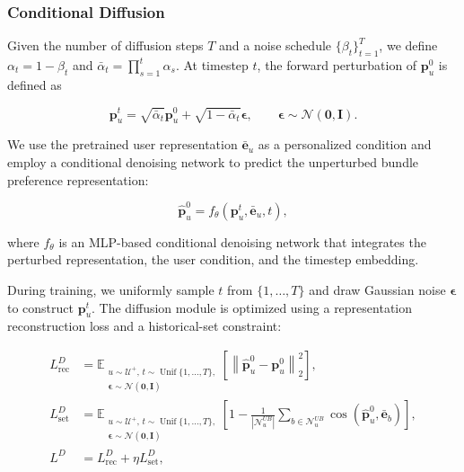 \documentclass[letterpaper]{article}
\begin{document}
\subsubsection{Conditional Diffusion}

Given the number of diffusion steps $T$ and a noise schedule
$\{\beta_t\}_{t=1}^{T}$, we define
$\alpha_t=1-\beta_t$ and
$\bar{\alpha}_t=\prod_{s=1}^{t}\alpha_s$.
At timestep $t$, the forward perturbation of $\mathbf p_u^0$ is
defined as

\begin{equation}
\mathbf p_u^t
=
\sqrt{\bar{\alpha}_t}\mathbf p_u^0
+
\sqrt{1-\bar{\alpha}_t}\boldsymbol{\epsilon},
\qquad
\boldsymbol{\epsilon}
\sim
\mathcal N(\mathbf 0,\mathbf I).
\tag{2}
\end{equation}

We use the pretrained user representation
$\bar{\mathbf e}_u$ as a personalized condition and employ a
conditional denoising network to predict the unperturbed bundle
preference representation:

\begin{equation}
\widehat{\mathbf p}_u^0
=
f_\theta
\left(
\mathbf p_u^t,
\bar{\mathbf e}_u,
t
\right),
\tag{3}
\end{equation}

where $f_\theta$ is an MLP-based conditional denoising network
that integrates the perturbed representation, the user condition,
and the timestep embedding.

During training, we uniformly sample $t$ from
$\{1,\ldots,T\}$ and draw Gaussian noise
$\boldsymbol{\epsilon}$ to construct $\mathbf p_u^t$. The
diffusion module is optimized using a representation
reconstruction loss and a historical-set constraint:

\begin{equation}
\begin{aligned}
L_{\mathrm{rec}}^{D}
&=
\mathbb E_{\substack{
u\sim\mathcal U^{+},\,
t\sim\operatorname{Unif}\{1,\ldots,T\},\\
\boldsymbol{\epsilon}\sim\mathcal N(\mathbf 0,\mathbf I)
}}
\left[
\left\|
\widehat{\mathbf p}_u^0-\mathbf p_u^0
\right\|_2^2
\right],
\\
L_{\mathrm{set}}^{D}
&=
\mathbb E_{\substack{
u\sim\mathcal U^{+},\,
t\sim\operatorname{Unif}\{1,\ldots,T\},\\
\boldsymbol{\epsilon}\sim\mathcal N(\mathbf 0,\mathbf I)
}}
\left[
1-
\frac{1}{|\mathcal N_u^{UB}|}
\sum_{b\in\mathcal N_u^{UB}}
\cos
\left(
\widehat{\mathbf p}_u^0,
\bar{\mathbf e}_b
\right)
\right],
\\
L^{D}
&=
L_{\mathrm{rec}}^{D}
+
\eta L_{\mathrm{set}}^{D},
\end{aligned}
\tag{4}
\end{equation}
\end{document}
